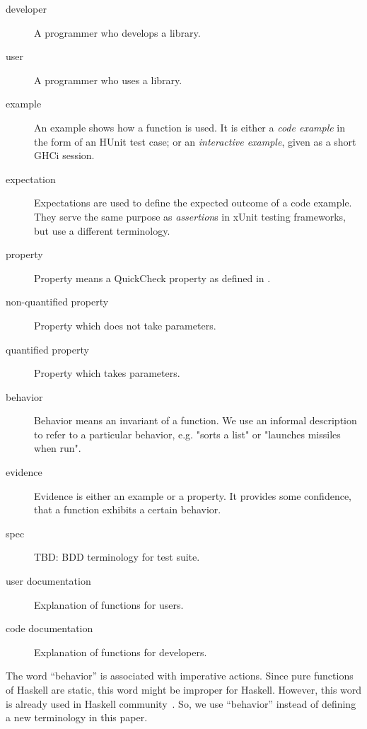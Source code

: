 \documentclass[preprint]{sigplanconf}
\begin{document}
\begin{description}

\item[developer]
    A programmer who develops a library.

\item[user]
    A programmer who uses a library.

\item[example]
    An example shows how a function is used.  It is either a \emph{code
    example} in the form of an HUnit test case; or an \emph{interactive
    example}, given as a short GHCi session.

\item[expectation]
    Expectations are used to define the expected outcome of a code
    example.  They serve the same purpose as \emph{assertion}\/s in xUnit
    testing frameworks, but use a different terminology.

\item[property]
    Property means a QuickCheck property as defined in
    \cite{quickcheck}.

\item[non-quantified property]
    Property which does not take parameters.

\item[quantified property]
    Property which takes parameters.

\item[behavior]
    Behavior means an invariant of a function.  We use an informal description
    to refer to a particular behavior, e.g.  "sorts a list" or "launches
    missiles when run".

\item[evidence]
    Evidence is either an example or a property.  It provides some confidence,
    that a function exhibits a certain behavior.

\item[spec]
    TBD: BDD terminology for test suite.

\item[user documentation]
    Explanation of functions for users.
\item[code documentation]
    Explanation of functions for developers.

\end{description}

The word ``behavior'' is associated with imperative actions.
Since pure functions of Haskell are static,
this word might be improper for Haskell.
However, this word is already used in Haskell community~\cite{typeclassopedia}.
So, we use ``behavior'' instead of defining a new terminology in this paper.
\end{document}
